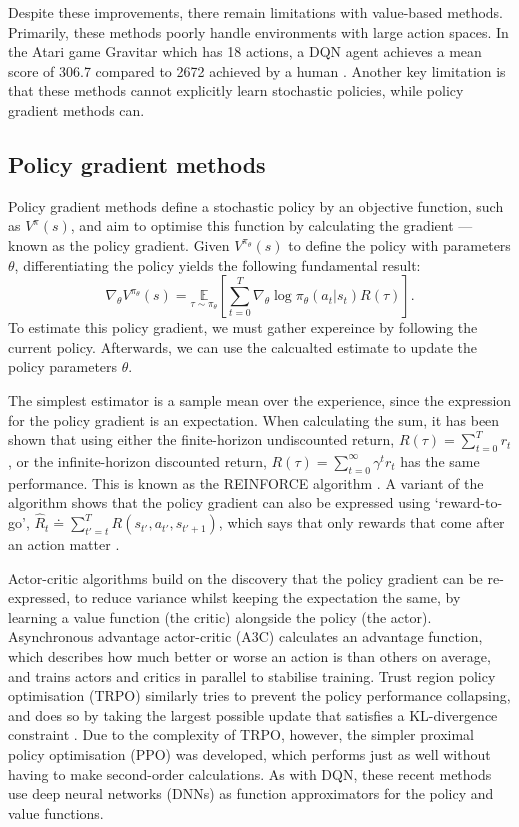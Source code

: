 \documentclass[12pt,a4paper]{article}
\begin{document}
Despite these improvements, there remain limitations with value-based methods. Primarily, these methods poorly handle environments with large action spaces. In the Atari game Gravitar which has 18 actions, a DQN agent achieves a mean score of 306.7 compared to 2672 achieved by a human \cite{Mnih2015}. Another key limitation is that these methods cannot explicitly learn stochastic policies, while policy gradient methods can.

\subsection{Policy gradient methods}
Policy gradient methods define a stochastic policy by an objective function, such as $V^{\pi}(s)$, and aim to optimise this function by calculating the gradient --- known as the policy gradient. Given $V^{\pi_{\theta}}(s)$ to define the policy with parameters $\theta$, differentiating the policy yields the following fundamental result: $$\nabla_{\theta} V^{\pi_{\theta}}(s) = \underset{\tau \sim \pi_{\theta}}{\mathbb{E}} \left[{\sum_{t=0}^{T} \nabla_{\theta} \log \pi_{\theta}(a_t |s_t) R(\tau)}\right].$$ To estimate this policy gradient, we must gather expereince by following the current policy. Afterwards, we can use the calcualted estimate to update the policy parameters $\theta$.

The simplest estimator is a sample mean over the experience, since the expression for the policy gradient is an expectation. When calculating the sum, it has been shown that using either the finite-horizon undiscounted return, $R(\tau) = \sum_{t=0}^T r_t$, or the infinite-horizon discounted return, $R(\tau) = \sum_{t=0}^{\infty} \gamma^t r_t$ has the same performance. This is known as the REINFORCE algorithm \cite{Williams1992}. A variant of the algorithm shows that the policy gradient can also be expressed using `reward-to-go', $\hat{R}_t \doteq \sum_{t'=t}^T R(s_{t'}, a_{t'}, s_{t'+1})$, which says that only rewards that come after an action matter \cite{SpinningUp2018}. 

Actor-critic algorithms \cite{Konda2000} build on the discovery that the policy gradient can be re-expressed, to reduce variance whilst keeping the expectation the same, by learning a value function (the critic) alongside the policy (the actor). Asynchronous advantage actor-critic (A3C) \cite{mnih2016asynchronous} calculates an advantage function, which describes how much better or worse an action is than others on average, and trains actors and critics in parallel to stabilise training. Trust region policy optimisation (TRPO) \cite{DBLP:journals/corr/SchulmanLMJA15} similarly tries to prevent the policy performance collapsing, and does so by taking the largest possible update that satisfies a KL-divergence constraint \cite{kullback1951information}. Due to the complexity of TRPO, however, the simpler proximal policy optimisation (PPO) \cite{DBLP:journals/corr/SchulmanWDRK17} was developed, which performs just as well without having to make second-order calculations. As with DQN, these recent methods use deep neural networks (DNNs) as function approximators for the policy and value functions.
\end{document}
